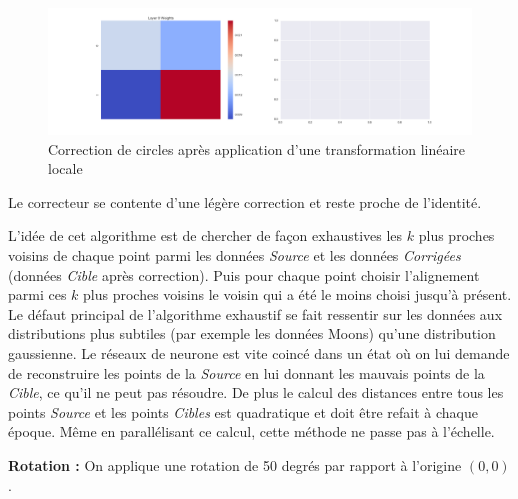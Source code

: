 \begin{figure}[H]
\includegraphics[width=\linewidth]{fig/24-05-2016/circles/Circles_GridBendClasswise_Corrector-W.png}
\caption{Correction de circles après application d'une transformation linéaire locale}
\label{fig:recap-circles-GridBend-classwise}
\end{figure}

Le correcteur se contente d'une légère correction et reste proche de l'identité.


L'idée de cet algorithme est de chercher de façon exhaustives les $k$ plus proches voisins de chaque point
parmi les données \emph{Source} et les données \emph{Corrigées} (données \emph{Cible} après correction).
Puis pour chaque point choisir l'alignement parmi ces $k$ plus proches voisins le voisin qui a été le moins choisi jusqu'à présent.
Le défaut principal de l'algorithme exhaustif se fait ressentir sur les données aux distributions plus subtiles
(par exemple les données Moons) qu'une distribution gaussienne. Le réseaux de neurone est vite coincé dans 
un état où on lui demande de reconstruire les points de la \emph{Source} en lui donnant les mauvais points
de la \emph{Cible}, ce qu'il ne peut pas résoudre.
De plus le calcul des distances entre tous les points \textit{Source} et les points \textit{Cibles} est quadratique
et doit être refait à chaque époque. Même en parallélisant ce calcul, cette méthode ne passe pas à l'échelle.

{\Large \textbf{Rotation :}} On applique une rotation de 50 degrés par rapport à l'origine $(0,0)$.

